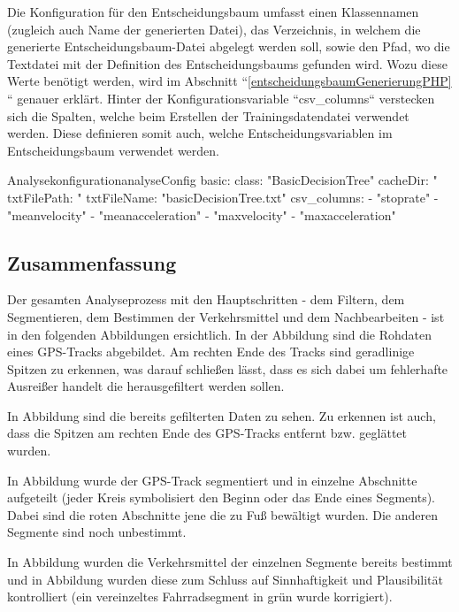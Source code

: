 Die Konfiguration für den Entscheidungsbaum umfasst einen Klassennamen (zugleich auch Name der generierten Datei), das Verzeichnis, in welchem die generierte Entscheidungsbaum-Datei abgelegt werden soll, sowie den Pfad, wo die Textdatei mit der Definition des Entscheidungsbaums gefunden wird. Wozu diese Werte benötigt werden, wird im Abschnitt ``\ref{entscheidungsbaumGenerierungPHP} `` genauer erklärt. Hinter der Konfigurationsvariable ``csv\_columns`` verstecken sich die Spalten, welche beim Erstellen der Trainingsdatendatei verwendet werden.  Diese definieren somit auch, welche Entscheidungsvariablen im Entscheidungsbaum verwendet werden.

\begin{code}[]{Analysekonfiguration}{analyseConfig}
    basic:
      class: "BasicDecisionTree"
      cacheDir: "%
      txtFilePath: "%
      txtFileName: "basicDecisionTree.txt"
      csv_columns:
        - "stoprate"
        - "meanvelocity"
        - "meanacceleration"
        - "maxvelocity"
        - "maxacceleration"
\end{code}

\subsection{Zusammenfassung}
Der gesamten Analyseprozess mit den Hauptschritten - dem Filtern, dem Segmentieren, dem Bestimmen der Verkehrsmittel und dem Nachbearbeiten - ist in den folgenden Abbildungen ersichtlich. In der Abbildung  sind die Rohdaten eines GPS-Tracks abgebildet. Am rechten Ende des Tracks sind geradlinige Spitzen zu erkennen, was darauf schließen lässt, dass es sich dabei um fehlerhafte Ausreißer handelt die herausgefiltert werden sollen.


In Abbildung  sind die bereits gefilterten Daten zu sehen. Zu erkennen ist auch, dass die Spitzen am rechten Ende des GPS-Tracks entfernt bzw. geglättet wurden.


 In Abbildung  wurde der GPS-Track segmentiert und in einzelne Abschnitte aufgeteilt (jeder Kreis symbolisiert den Beginn oder das Ende eines Segments). Dabei sind die roten Abschnitte jene die zu Fuß bewältigt wurden. Die anderen Segmente sind noch unbestimmt.


In Abbildung  wurden die Verkehrsmittel der einzelnen Segmente bereits bestimmt und in Abbildung  wurden diese zum Schluss auf Sinnhaftigkeit und Plausibilität kontrolliert (ein vereinzeltes Fahrradsegment in grün wurde korrigiert).


